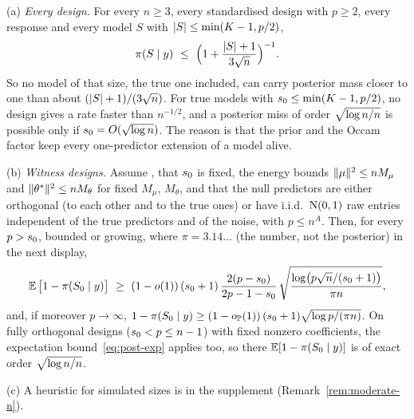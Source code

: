 
\begin{remark}\label{rem:sharp}
\textup{(a)} \emph{Every design.} For every $n\ge3$, every standardised design with $p\ge2$, every response and every
model $S$ with $\lvert S\rvert\le\min(K-1,p/2)$,
\begin{equation}\label{eq:sharp-a}
  \pi(S\mid y)\ \le\ \Big(1+\frac{\lvert S\rvert+1}{3\sqrt n}\Big)^{-1}.
\end{equation}
So no model of that size, the true one included, can carry posterior mass closer to one than about
$(\lvert S\rvert+1)/(3\sqrt n)$. For true models with $s_0\le\min(K-1,p/2)$, no design gives a rate faster than
$n^{-1/2}$, and a posterior miss of order $\sqrt{\log n/n}$ is possible only if $s_0=O(\sqrt{\log n})$. The reason is that the prior and the Occam factor keep every one-predictor extension of a model
alive.

\textup{(b)} \emph{Witness designs.} Assume , that $s_0$ is fixed, the energy bounds $\lVert \mu\rVert^2\le nM_\mu$ and
$\lVert \theta^*\rVert^2\le nM_\theta$ for fixed $M_\mu$, $M_\theta$, and that the null predictors are either orthogonal (to each
other and to the true ones) or have i.i.d.\ $\mathrm{N}(0,1)$ raw entries independent of the true predictors and of the noise, with $p\le n^A$.
Then, for every $p>s_0$, bounded or growing,
where $\pi=3.14\ldots$ (the number, not the posterior) in the next display,
\begin{equation}\label{eq:sharp-b}
  \E\big[1-\pis{\Sz}\big]\ \ge\ (1-o(1))\,(\sz+1)\,\frac{2(p-\sz)}{2p-1-\sz}\,
  \sqrt{\frac{\log\!\big(p\sqrt n/(\sz+1)\big)}{\pi n}},
\end{equation}
and, if moreover $p\to\infty$, $1-\pi(S_0\mid y)\ge(1-o_{\mathbb{P}}(1))\,(s_0+1)\sqrt{\log p/(\pi n)}$. On fully
orthogonal designs ($s_0<p\le n-1$) with fixed nonzero coefficients, the expectation bound~\eqref{eq:post-exp} applies
too, so there $\operatorname{\mathbb{E}}[1-\pi(S_0\mid y)]$ is of exact order $\sqrt{\log n/n}$.

\textup{(c)} A heuristic for simulated sizes is in the supplement (Remark~\ref{rem:moderate-n}).
\end{remark}



